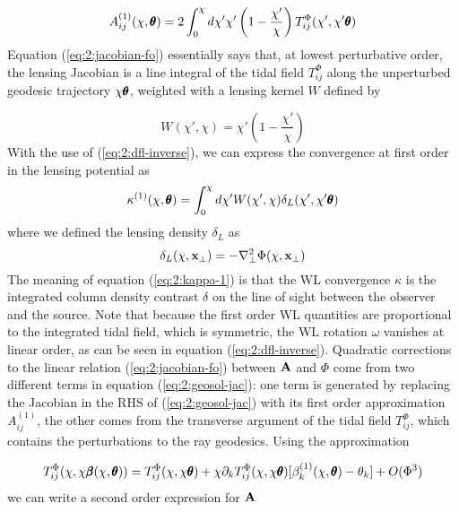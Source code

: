 \begin{equation}
\label{eq:2:jacobian-fo}
A_{ij}^{(1)}(\chi,\pmb{\theta}) = 2\int_0^\chi d\chi'\chi'\left(1-\frac{\chi'}{\chi}\right)T^{\Phi}_{ij}(\chi',\chi'\pmb{\theta})
\end{equation}
%
Equation (\ref{eq:2:jacobian-fo}) essentially says that, at lowest perturbative order, the lensing Jacobian is a line integral of the tidal field $T^{\Phi}_{ij}$ along the unperturbed geodesic trajectory $\chi\pmb{\theta}$, weighted with a lensing kernel $W$ defined by

\begin{equation}
W(\chi',\chi) = \chi'\left(1-\frac{\chi'}{\chi}\right) 
\end{equation}
%
With the use of (\ref{eq:2:dfl-inverse}), we can express the convergence at first order in the lensing potential as
\begin{equation}
\label{eq:2:kappa-1}
\kappa^{(1)}(\chi,\pmb{\theta}) = \int_0^{\chi}d\chi' W(\chi',\chi)\delta_L(\chi',\chi'\pmb{\theta})
\end{equation}
%
where we defined the lensing density $\delta_L$ as 
\begin{equation}
\label{eq:2:deltalens}
\delta_L(\chi,\mathbf{x}_\perp) = -\nabla^2_\perp \Phi(\chi,\mathbf{x}_\perp)
\end{equation}
%
The meaning of equation (\ref{eq:2:kappa-1}) is that the WL convergence $\kappa$ is the integrated column density contrast $\delta$ on the line of sight between the observer and the source. Note that because the first order WL quantities are proportional to the integrated tidal field, which is symmetric, the WL rotation $\omega$ vanishes at linear order, as can be seen in equation (\ref{eq:2:dfl-inverse}). 
Quadratic corrections to the linear relation (\ref{eq:2:jacobian-fo}) between $\mathbf{A}$ and $\Phi$ come from two different terms in equation (\ref{eq:2:geosol-jac}): one term is generated by replacing the Jacobian in the RHS of (\ref{eq:2:geosol-jac}) with its first order approximation $A_{ij}^{(1)}$, the other comes from the transverse argument of the tidal field $T^{\Phi}_{ij}$, which contains the perturbations to the ray geodesics. Using the approximation

\begin{equation}
\label{eq:2:tidalapprox}
T^{\Phi}_{ij}(\chi,\chi\pmb{\beta}(\chi,\pmb{\theta})) = T^{\Phi}_{ij}(\chi,\chi\pmb{\theta}) + \chi\partial_kT^{\Phi}_{ij}(\chi,\chi\pmb{\theta})[\beta_k^{(1)}(\chi,\pmb{\theta})-\theta_k] + O(\Phi^3) 
\end{equation}
%
we can write a second order expression for $\mathbf{A}$ 

